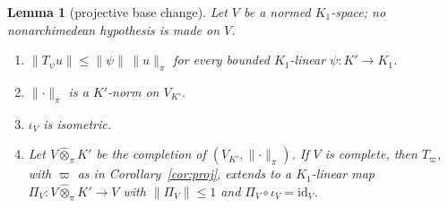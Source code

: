 \documentclass[11pt]{amsart}
\newtheorem{lemma}[theorem]{Lemma}
\theoremstyle{definition}
\theoremstyle{remark}
\numberwithin{equation}{section}
\newcommand{\id}{\mathrm{id}}
\newcommand{\norm}[1]{\lVert #1\rVert}
\theoremstyle{plain}
\theoremstyle{definition}
\theoremstyle{plain}
\begin{document}
\begin{lemma}[projective base change]\label{lem:bc}
Let $V$ be a normed $K_1$\nobreakdash-space; no nonarchimedean hypothesis is made on $V$.
\begin{enumerate}
\item $\norm{T_\psi u}\le\norm\psi\,\norm u_\pi$ for every bounded $K_1$\nobreakdash-linear $\psi\colon K'\to K_1$.
\item $\norm\cdot_\pi$ is a $K'$\nobreakdash-norm on $V_{K'}$.
\item $\iota_V$ is isometric.
\item Let $V\widehat\otimes_\pi K'$ be the completion of $(V_{K'},\norm\cdot_\pi)$. If $V$ is complete, then $T_\varpi$, with
$\varpi$ as in Corollary~\ref{cor:proj}, extends to a $K_1$\nobreakdash-linear map $\Pi_V\colon V\widehat\otimes_\pi K'\to V$ with
$\norm{\Pi_V}\le1$ and $\Pi_V\circ\iota_V=\id_V$.
\end{enumerate}
\end{lemma}
\end{document}
